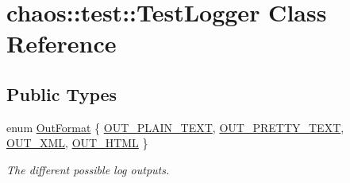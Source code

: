 \hypertarget{classchaos_1_1test_1_1_test_logger}{\section{chaos\-:\-:test\-:\-:Test\-Logger Class Reference}
\label{classchaos_1_1test_1_1_test_logger}
}
\subsection*{Public Types}
\begin{DoxyCompactItemize}
\item 
enum \hyperlink{classchaos_1_1test_1_1_test_logger_a8e6f679501d623e41ac0f0c445a7820d}{Out\-Format} \{ \hyperlink{classchaos_1_1test_1_1_test_logger_a8e6f679501d623e41ac0f0c445a7820da1a2f59f0cda45e5e885203795f8b4ea5}{O\-U\-T\-\_\-\-P\-L\-A\-I\-N\-\_\-\-T\-E\-X\-T}, 
\hyperlink{classchaos_1_1test_1_1_test_logger_a8e6f679501d623e41ac0f0c445a7820da1df1af0bb0daa7976737fe1724966df2}{O\-U\-T\-\_\-\-P\-R\-E\-T\-T\-Y\-\_\-\-T\-E\-X\-T}, 
\hyperlink{classchaos_1_1test_1_1_test_logger_a8e6f679501d623e41ac0f0c445a7820da6a80efff59f1f2addd6f2b337579a2c0}{O\-U\-T\-\_\-\-X\-M\-L}, 
\hyperlink{classchaos_1_1test_1_1_test_logger_a8e6f679501d623e41ac0f0c445a7820da278e04e01eafa1f1ddca6ec7cc1ca576}{O\-U\-T\-\_\-\-H\-T\-M\-L}
 \}
\begin{DoxyCompactList}\small\item\em The different possible log outputs. \end{DoxyCompactList}\end{DoxyCompactItemize}
